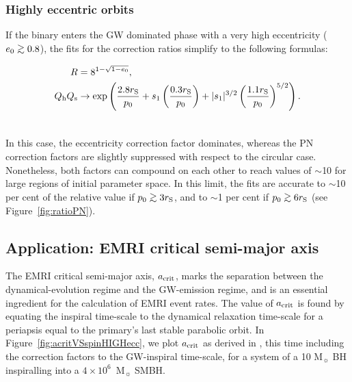 \documentclass[usenatbib]{mnras}
\def\gsim{\mathrel{\rlap{\lower 3pt \hbox{$\sim$}} \raise 2.0pt \hbox{$>$}}}
\begin{document}
\subsubsection{Highly eccentric orbits}\label{sec:HighlyEccentricOrbits}

If the binary enters the GW dominated phase with a very high eccentricity ($e_0 \gsim 0.8 $), the fits for the correction ratios simplify to the following formulas:

\begin{align}
 R &= 8^{1-\sqrt{1-e_0}}, \\
    Q_{\rm h}Q_{\rm s} &\to \exp \left( \frac{2.8 r_{\rm S}}{p_0} + s_1\left( \frac{0.3 r_{\rm S}}{p_0}\right) + \lvert s_1 \rvert ^{3/2} \left( \frac{1.1 r_{\rm S}}{p_0} \right)^{5/2} \right). \label{eq:r4} \\ \nonumber
\end{align}

In this case, the eccentricity correction factor dominates, whereas the PN correction factors are slightly suppressed with respect to the circular case. Nonetheless, both factors can compound on each other to reach values of $\sim$10 for  large regions of initial parameter space. In this limit, the fits are accurate to $\sim$10 per cent of the relative value if $p_0 \gsim 3 r_{\rm S}$, and to $\sim$1 per cent if $p_0 \gsim 6 r_{\rm S}$ (see Figure~\ref{fig:ratioPN}).

\subsection{Application: EMRI critical semi-major axis}

The EMRI critical semi-major axis, $a_{\rm crit}$, marks the separation between the dynamical-evolution regime and the GW-emission regime, and is an essential ingredient for the calculation of EMRI event rates. The value of $a_{\rm crit}$ is found by equating the inspiral time-scale to the dynamical relaxation time-scale for a periapsis equal to the primary's last stable parabolic orbit. In Figure~\ref{fig:acritVSspinHIGHecc}, we plot $a_{\rm crit}$ as derived in \cite{Amaro_Seoane_2019}, this time including the correction factors to the GW-inspiral time-scale, for a system of a 10 M$_{\sun}$ BH inspiralling into a $4 \times 10^6$~M$_{\sun}$ SMBH.
\end{document}
